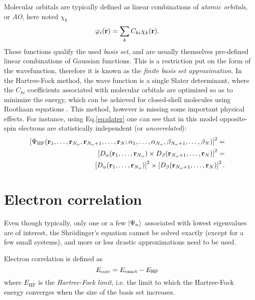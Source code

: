 \documentclass[./thesis.tex]{subfiles}
\begin{document}
Molecular orbitals are typically defined as linear combinations of \emph{atomic orbitals}, or \emph{AO}, here noted $\chi_k$
\begin{equation}
 \varphi_i({\bf r}) = \sum_k C_{ki} \chi_k({\bf r}).
\end{equation}
These functions qualify the used \emph{basis set}, and are usually themselves pre-defined linear combinations of Gaussian functions. This is a restriction put on the form of the wavefunction, therefore it is known as the \emph{finite basis set approximation}.
In the Hartree-Fock method, the wave function is a single Slater determinant, where the $C_{ki}$ coefficients associated with molecular orbitals are optimized so as to minimize the energy, which can be achieved for closed-shell molecules using Roothaan equations \cite{Roothaan_1951}. This method, however is missing some important physical effects. For instance, using Eq.\eqref{eq:slater} one can see that in this model opposite-spin electrons are statistically independent (or \emph{uncorrelated}):
\begin{equation}
\begin{split}
\left[ \Psi_\textrm{HF}({\bf r}_1,\dots,{\bf r}_{{N_\alpha}},{\bf r}_{{N_\alpha}+1},\dots,{\bf r}_N;
      \alpha_1,\dots,\alpha_{{N_\alpha}},\beta_{{N_\alpha}+1},\dots,\beta_N) \right]^2 = \\
\left[ D_\alpha({\bf r}_1,\dots,{\bf r}_{{N_\alpha}}) \times D_\beta({\bf r}_{{N_\alpha}+1},\dots,{\bf r}_N) \right]^2 = \\
\left[ D_\alpha({\bf r}_1,\dots,{\bf r}_{{N_\alpha}}) \right]^2 \times \left[ D_\beta({\bf r}_{{N_\alpha}+1},\dots,{\bf r}_N) \right]^2.
\end{split}
\end{equation}

\section{Electron correlation}
Even though typically, only one or a few $\ket{\Psi_n}$ associated with lowest eigenvalues are of interest, the Shrödinger's equation cannot be solved exactly (except for a few small systems), and more or less drastic approximations need to be used. 

Electron correlation is defined as\cite{Lowdin_1959}
\begin{equation}
E_\text{corr} = E_\text{exact} - E_\text{HF}
\end{equation}
where $E_\text{HF}$ is the \emph{Hartree-Fock limit}, i.e. the limit to which the Hartree-Fock energy converges when the size of the basis set increases.
\end{document}
